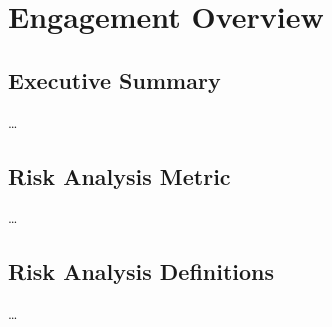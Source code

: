 \section{Engagement Overview}
\subsection{Executive Summary}
\dots
\subsection{Risk Analysis Metric}
\dots
\subsection{Risk Analysis Definitions}
\dots
